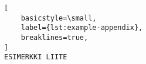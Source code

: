 \begin{lstlisting}[
    basicstyle=\small,
    label={lst:example-appendix},
    breaklines=true,
]
ESIMERKKI LIITE
\end{lstlisting}
